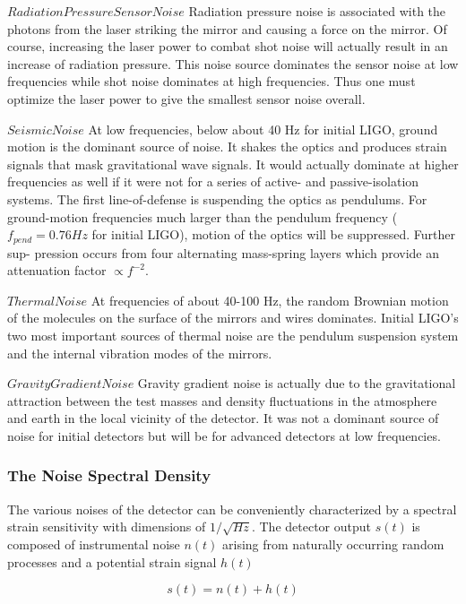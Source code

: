 \documentclass[binding=0.6cm, LaM]{sapthesis}
\begin{document}
	$Radiation Pressure Sensor Noise$
	Radiation pressure noise is associated with the photons from the laser striking the mirror 
	and causing a force on the mirror. Of course, increasing the laser power to combat shot noise 
	will actually result in an increase of radiation pressure. 
	This noise source dominates the sensor noise at low frequencies while shot noise dominates 
	at high frequencies. Thus one must optimize the laser power to give the smallest sensor noise overall.

	$Seismic Noise$
	At low frequencies, below about 40 Hz for initial LIGO, ground motion is the dominant
	source of noise. It shakes the optics and produces strain signals that mask gravitational wave
	signals. It would actually dominate at higher frequencies as well if it were not for a series
	of active- and passive-isolation systems. The first line-of-defense is suspending the optics
	as pendulums. For ground-motion frequencies much larger than the pendulum frequency
	($f_{pend} = 0.76 Hz$ for initial LIGO), motion of the optics will be suppressed. Further sup-
	pression occurs from four alternating mass-spring layers which provide an attenuation factor
	$\propto f^{-2}$.

	$Thermal Noise$
	At frequencies of about 40-100 Hz, the random Brownian motion of the molecules on the surface 
	of the mirrors and wires dominates. Initial LIGO’s two most important sources of thermal noise 
	are the pendulum suspension system and the internal vibration modes of the mirrors.

	$Gravity Gradient Noise$
	Gravity gradient noise is actually due to the gravitational attraction between the test masses 
	and density fluctuations in the atmosphere and earth in the local vicinity of the detector. 
	It was not a dominant source of noise for initial detectors but will be for advanced detectors at low frequencies.

\subsubsection{The Noise Spectral Density}

	The various noises of the detector can be conveniently characterized by a spectral strain
	sensitivity with dimensions of $1/\sqrt{Hz}$.
	The detector output $s(t)$ is composed of instrumental noise $n(t)$ arising from 
	naturally occurring random processes and a potential strain signal $h(t)$

		\begin{equation}
		s(t) = n(t) + h(t)
		\end{equation}
\end{document}
